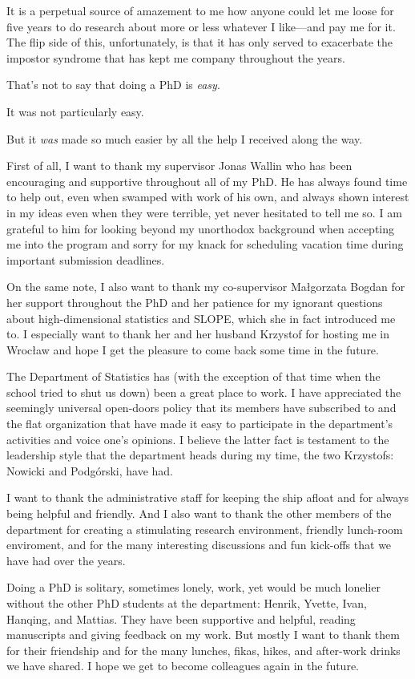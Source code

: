 \documentclass{book}
\begin{document}
\noindent It is a perpetual source of amazement to me how anyone could let me loose for five years to do research about more or less whatever I like---and pay me for it. The flip side of this, unfortunately, is that it has only served to exacerbate the impostor syndrome that has kept me company throughout the years.

That's not to say that doing a PhD is \emph{easy}.

It was not particularly easy.

But it \emph{was} made so much easier by all the help I received along the way.

First of all, I want to thank my supervisor Jonas Wallin who has been encouraging and supportive throughout all of my PhD. He has always found time to help out, even when swamped with work of his own, and always shown interest in my ideas even when they were terrible, yet never hesitated to tell me so. I am grateful to him for looking beyond my unorthodox background when accepting me into the program and sorry for my knack for scheduling vacation time during important submission deadlines.

On the same note, I also want to thank my co-supervisor Małgorzata Bogdan for her support throughout the PhD and her patience for my ignorant questions about high-dimensional statistics and SLOPE, which she in fact introduced me to. I especially want to thank her and her husband Krzystof for hosting me in Wrocław and hope I get the pleasure to come back some time in the future.

The Department of Statistics has (with the exception of that time when the school tried to shut us down) been a great place to work. I have appreciated the seemingly universal open-doors policy that its members have subscribed to and the flat organization that have made it easy to participate in the department's activities and voice one's opinions. I believe the latter fact is testament to the leadership style that the department heads during my time, the two Krzystofs: Nowicki and Podgórski, have had.

I want to thank the administrative staff for keeping the ship afloat and for always being helpful and friendly. And I also want to thank the other members of the department for creating a stimulating research environment, friendly lunch-room enviroment, and for the many interesting discussions and fun kick-offs that we have had over the years.

Doing a PhD is solitary, sometimes lonely, work, yet would be much lonelier without the other PhD students at the department: Henrik, Yvette, Ivan, Hanqing, and Mattias. They have been supportive and helpful, reading manuscripts and giving feedback on my work. But mostly I  want to thank them for their friendship and for the many lunches, fikas, hikes, and after-work drinks we have shared. I hope we get to become colleagues again in the future.
\end{document}
